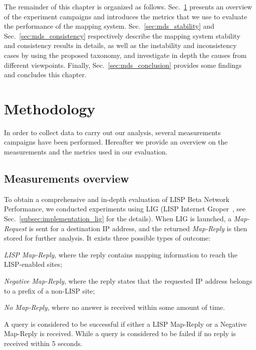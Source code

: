 The remainder of this chapter is organized as follows. Sec.~\ref{sec:mds_methodology} presents an overview of the experiment campaigns and introduces the metrics that we use to evaluate the performance of the mapping system. Sec.~\ref{sec:mds_stability} and Sec.~\ref{sec:mds_consistency} respectively describe the mapping system stability and consistency results in details, as well as the instability and inconsistency cases by using the proposed taxonomy, and investigate in depth the causes from different viewpoints. Finally, Sec.~\ref{sec:mds_conclusion} provides some findings and concludes this chapter.

\section{Methodology}
\label{sec:mds_methodology}
In order to collect data to carry out our analysis, several measurements campaigns have been performed. Hereafter we provide an overview on the measurements and the metrics used in our evaluation.

\subsection{Measurements overview}
\label{sec:mds_overview}
To obtain a comprehensive and in-depth evaluation of LISP Beta Network Performance, we conducted experiments using LIG (LISP Internet Groper~\cite{rfc6835}, see Sec.~\ref{subsec:implementation_lig} for the details). When LIG is launched, a \emph{Map-Request} is sent for a destination IP address, and the returned \emph{Map-Reply} is then stored for further analysis. It exists three possible types of outcome: 
\begin{inparaenum}[(i)]
	\item \emph{LISP Map-Reply}, where the reply contains mapping
	information to reach the LISP-enabled sites;
	\item \emph{Negative Map-Reply}, where the reply states that the requested IP address belongs to a prefix of a non-LISP site;
	\item \emph{No Map-Reply}, where no answer is received within some
amount of time.
\end{inparaenum}
A query is considered to be successful if either a LISP Map-Reply or a Negative Map-Reply is received. While a query is considered to be failed if no reply is received within 5 seconds. 

